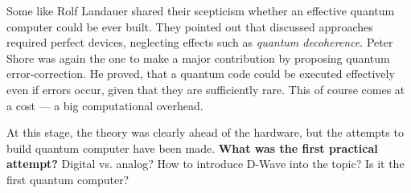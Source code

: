 Some like Rolf Landauer shared their scepticism whether an effective quantum computer could be ever built. They pointed out that discussed approaches required perfect devices, neglecting effects such as \textit{quantum decoherence}. Peter Shore was again the one to make a major contribution by proposing quantum error-correction. He proved, that a quantum code could be executed effectively even if errors occur, given that they are sufficiently rare. This of course comes at a cost --- a big computational overhead.

At this stage, the theory was clearly ahead of the hardware, but the attempts to build quantum computer have been made. \textbf{What was the first practical attempt?}
Digital vs. analog? How to introduce D-Wave into the topic? Is it the first quantum computer?



